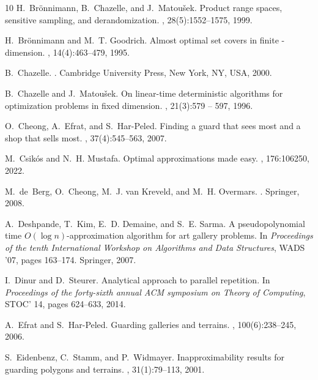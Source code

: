 \documentclass[a4paper,11pt]{article}
\begin{document}
\begin{thebibliography}{10}
	H.~Br\"{o}nnimann, B.~Chazelle, and J.~Matou{\v{s}}ek.
	\newblock Product range spaces, sensitive sampling, and derandomization.
	, 28(5):1552--1575, 1999.
	
	H.~Br{\"o}nnimann and M.~T. Goodrich.
	\newblock Almost optimal set covers in finite -dimension.
	, 14(4):463--479, 1995.
	
	B.~Chazelle.
	.
	\newblock Cambridge University Press, New York, NY, USA, 2000.
	
	B.~Chazelle and J.~Matou{\v{s}}ek.
	\newblock On linear-time deterministic algorithms for optimization problems in
	fixed dimension.
	, 21(3):579 -- 597, 1996.
	
	O.~Cheong, A.~Efrat, and S.~Har{-}Peled.
	\newblock Finding a guard that sees most and a shop that sells most.
	, 37(4):545--563, 2007.
	
	M.~Csik\'{o}s and N.~H. Mustafa.
	\newblock Optimal approximations made easy.
	, 176:106250, 2022.
	
	M.~de~Berg, O.~Cheong, M.~J. van Kreveld, and M.~H. Overmars.
	.
	\newblock Springer, 2008.
	
	A.~Deshpande, T.~Kim, E.~D. Demaine, and S.~E. Sarma.
	\newblock A pseudopolynomial time \textbf{$O(\log n)$}-approximation algorithm
	for art gallery problems.
	\newblock In {\em Proceedings of the tenth International Workshop on Algorithms
		and Data Structures}, WADS '07, pages 163--174. Springer, 2007.
	
	I.~Dinur and D.~Steurer.
	\newblock Analytical approach to parallel repetition.
	\newblock In {\em Proceedings of the forty-sixth annual ACM symposium on Theory
		of Computing}, STOC' 14, pages 624--633, 2014.
	
	A.~Efrat and S.~Har{-}Peled.
	\newblock Guarding galleries and terrains.
	, 100(6):238--245, 2006.
	
	S.~Eidenbenz, C.~Stamm, and P.~Widmayer.
	\newblock Inapproximability results for guarding polygons and terrains.
	, 31(1):79--113, 2001.
	

\end{thebibliography}
\end{document}
